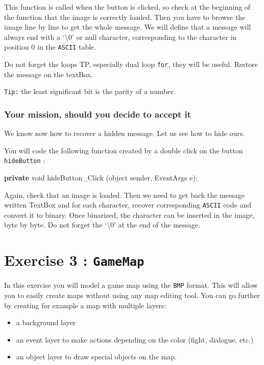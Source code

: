 \documentclass[11pt, a4paper]{article}
\newenvironment{Shaded}{}{}
\newcommand{\KeywordTok}[1]{\textcolor[rgb]{0.00,0.44,0.13}{\textbf{{#1}}}}
\newcommand{\DataTypeTok}[1]{\textcolor[rgb]{0.56,0.13,0.00}{{#1}}}
\newcommand{\FunctionTok}[1]{\textcolor[rgb]{0.02,0.16,0.49}{{#1}}}
\newcommand{\NormalTok}[1]{{#1}}
\begin{document}
This function is called when the button is clicked, so check at the
beginning of the function that the image is correctly loaded. Then you
have to browse the image line by line to get the whole message. We will
define that a message will always end with a `\textbackslash{}0' or null
character, corresponding to the character in position 0 in the
\texttt{ASCII} table.

Do not forget the loops TP, especially dual loop \texttt{for}, they will
be useful. Restore the message on the textBox.

\texttt{Tip:} the least significant bit is the parity of a number.

\subsubsection{Your mission, should you decide to accept
it}\label{your-mission-should-you-decide-to-accept-it}

We know now how to recover a hidden message. Let us see how to hide
ours.

You will code the following function created by a double click on the
button \texttt{hideButton} :

\begin{Shaded}
\begin{Highlighting}[]
\KeywordTok{private} \DataTypeTok{void} \FunctionTok{hideButton_Click} \NormalTok{(}\DataTypeTok{object} \NormalTok{sender, EventArgs e);}
\end{Highlighting}
\end{Shaded}

Again, check that an image is loaded. Then we need to get back the
message written TextBox and for each character, recover corresponding
\texttt{ASCII} code and convert it to binary. Once binarized, the
character can be inserted in the image, byte by byte. Do not forget the
`\textbackslash{}0' at the end of the message.
\section{Exercise 3 : \texttt{GameMap}}\label{exercise-3-gamemap}

In this exercise you will model a game map using the \texttt{BMP}
format. This will allow you to easily create maps without using any map
editing tool. You can go further by creating for example a map with
multiple layers:

\begin{itemize}
\itemsep1pt\parskip0pt
\item
  a background layer
\item
  an event layer to make actions depending on the color (fight,
  dialogue, etc.)
\item
  an object layer to draw special objects on the map.\newline
\end{itemize}
\end{document}
